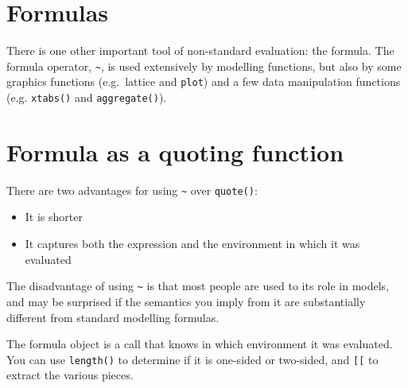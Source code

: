 \section{Formulas}

There is one other important tool of non-standard evaluation: the
formula. The formula operator, \texttt{\textasciitilde{}}, is used
extensively by modelling functions, but also by some graphics functions
(e.g.~lattice and \texttt{plot}) and a few data manipulation functions
(e.g. \texttt{xtabs()} and \texttt{aggregate()}).

\section{Formula as a quoting function}

There are two advantages for using \texttt{\textasciitilde{}} over
\texttt{quote()}:

\begin{itemize}
\itemsep1pt\parskip0pt
\item
  It is shorter
\item
  It captures both the expression and the environment in which it was
  evaluated
\end{itemize}

The disadvantage of using \texttt{\textasciitilde{}} is that most people
are used to its role in models, and may be surprised if the semantics
you imply from it are substantially different from standard modelling
formulas.

The formula object is a call that knows in which environment it was
evaluated. You can use \texttt{length()} to determine if it is one-sided
or two-sided, and \texttt{{[}{[}} to extract the various pieces.

\begin{Shaded}
\begin{Highlighting}[]
\StringTok{ }\ErrorTok{~}\StringTok{ }\StringTok{ }
\NormalTok{f1[[}\NormalTok{]]}
\NormalTok{f1[[}\NormalTok{]]}

\StringTok{ }\StringTok{ }\StringTok{ }
\NormalTok{f2[[}\NormalTok{]]}
\NormalTok{f2[[}\NormalTok{]]}
\NormalTok{f2[[}\NormalTok{]]}
\end{Highlighting}
\end{Shaded}

